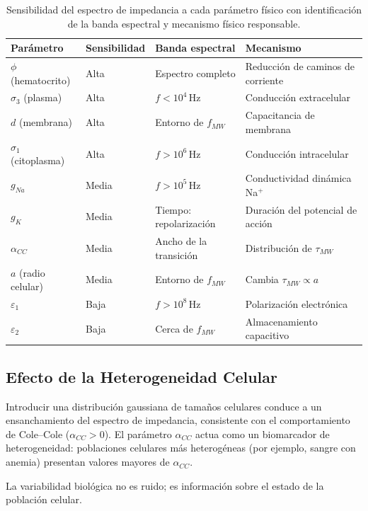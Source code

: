 \documentclass[12pt]{article}
\begin{document}
\begin{table}[H]
\centering
\caption{Sensibilidad del espectro de impedancia a cada par\'ametro f\'isico con
identificaci\'on de la banda espectral y mecanismo f\'isico responsable.}
\label{tab:sensibilidad}
\begin{tabular}{@{}llll@{}}
\toprule
\textbf{Par\'ametro} & \textbf{Sensibilidad} & \textbf{Banda espectral} & \textbf{Mecanismo} \\
\midrule
$\phi$ (hematocrito) & Alta & Espectro completo & Reducci\'on de caminos de corriente \\
$\sigma_3$ (plasma) & Alta & $f < 10^4\,\text{Hz}$ & Conducci\'on extracelular \\
$d$ (membrana) & Alta & Entorno de $f_{MW}$ & Capacitancia de membrana \\
$\sigma_1$ (citoplasma) & Alta & $f > 10^6\,\text{Hz}$ & Conducci\'on intracelular \\
$g_{Na}$ & Media & $f > 10^5\,\text{Hz}$ & Conductividad din\'amica Na$^+$ \\
$g_K$ & Media & Tiempo: repolarizaci\'on & Duraci\'on del potencial de acci\'on \\
$\alpha_{CC}$ & Media & Ancho de la transici\'on & Distribuci\'on de $\tau_{MW}$ \\

$a$ (radio celular) & Media & Entorno de $f_{MW}$ & Cambia $\tau_{MW} \propto a$ \\
$\varepsilon_1$ & Baja & $f > 10^8\,\text{Hz}$ & Polarizaci\'on electr\'onica \\
$\varepsilon_2$ & Baja & Cerca de $f_{MW}$ & Almacenamiento capacitivo \\
\bottomrule
\end{tabular}
\end{table}

\subsection{Efecto de la Heterogeneidad Celular}

Introducir una distribuci\'on gaussiana de tama\~{n}os celulares conduce a un ensanchamiento
del espectro de impedancia, consistente con el comportamiento de Cole--Cole ($\alpha_{CC} > 0$).
El par\'ametro $\alpha_{CC}$ actua como un biomarcador de heterogeneidad: poblaciones
celulares m\'as heterog\'eneas (por ejemplo, sangre con anemia) presentan valores mayores de
$\alpha_{CC}$.

La variabilidad biol\'ogica no es ruido; es informaci\'on sobre el estado de la poblaci\'on
celular.
\end{document}
